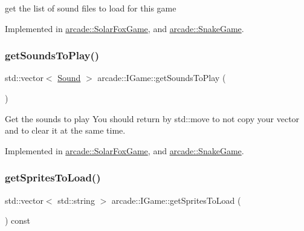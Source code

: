 get the list of sound files to load for this game 



Implemented in \hyperlink{classarcade_1_1_solar_fox_game_aed75a8fdc63d9162359ada5332b44331}{arcade\+::\+Solar\+Fox\+Game}, and \hyperlink{classarcade_1_1_snake_game_a2d8ca7114ab012187da99658a221fab9}{arcade\+::\+Snake\+Game}.

\mbox{\label{classarcade_1_1_i_game_a88b3c7efb13780cdbbdf5b879a18ed4d}} 
\subsubsection{\texorpdfstring{get\+Sounds\+To\+Play()}{getSoundsToPlay()}}
{\footnotesize\ttfamily std\+::vector$<$ \hyperlink{structarcade_1_1_sound}{Sound} $>$ arcade\+::\+I\+Game\+::get\+Sounds\+To\+Play (\begin{DoxyParamCaption}{ }\end{DoxyParamCaption})\hspace{0.3cm}{\ttfamily [pure virtual]}}



Get the sounds to play You should return by std\+::move to not copy your vector and to clear it at the same time. 



Implemented in \hyperlink{classarcade_1_1_solar_fox_game_a96f41df94a733d0c06f8a7d48e620d58}{arcade\+::\+Solar\+Fox\+Game}, and \hyperlink{classarcade_1_1_snake_game_aab993e72ca1b68914c37209781a68835}{arcade\+::\+Snake\+Game}.

\mbox{\label{classarcade_1_1_i_game_a2d0dc7c78a68c4dd0359911775993f68}} 
\subsubsection{\texorpdfstring{get\+Sprites\+To\+Load()}{getSpritesToLoad()}}
{\footnotesize\ttfamily std\+::vector$<$ std\+::string $>$ arcade\+::\+I\+Game\+::get\+Sprites\+To\+Load (\begin{DoxyParamCaption}{ }\end{DoxyParamCaption}) const\hspace{0.3cm}{\ttfamily [pure virtual]}}



